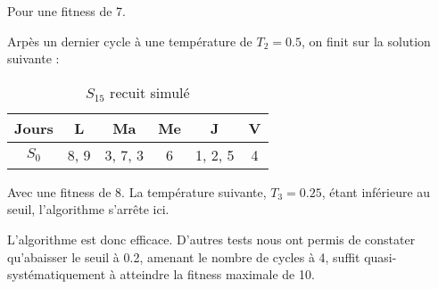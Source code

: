 {    Pour une fitness de 7.

    Arpès un dernier cycle à une température de $T_2 = 0.5$, on finit sur la solution suivante :

\newpage

    \begin{table}[!h]
        \centering
        \begin{tabular}{|c|c|c|c|c|c|}
            \hline
            Jours & L    & Ma      & Me & J       & V \\
            \hline
            $S_0$ & 8, 9 & 3, 7, 3 & 6  & 1, 2, 5 & 4 \\
            \hline
        \end{tabular}\caption{$S_{15}$ recuit simulé}
    \end{table}

    Avec une fitness de 8. La température suivante, $T_3 = 0.25$, étant inférieure au seuil, l'algorithme s'arrête ici.

L'algorithme est donc efficace. D'autres tests nous ont permis de constater qu'abaisser le seuil à 0.2, amenant le nombre de cycles à 4, suffit quasi-systématiquement à atteindre la fitness maximale de 10.

}